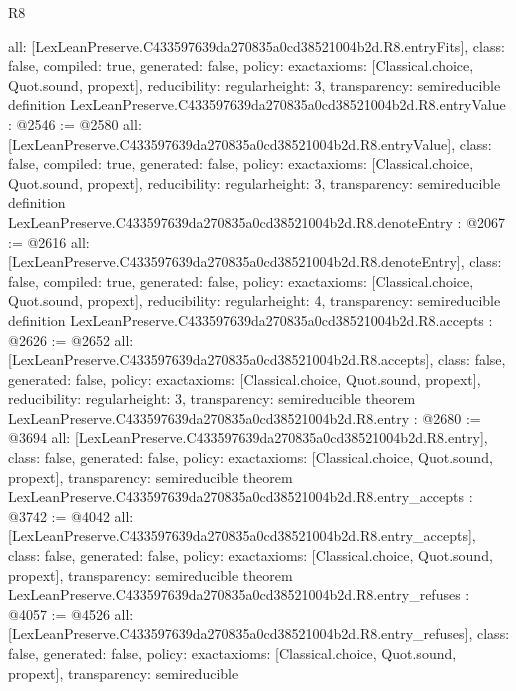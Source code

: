 \begin{lexlean}{R8}
\begin{coremodule}
{  all: [LexLeanPreserve.C433597639da270835a0cd38521004b2d.R8.entryFits],
  class: false,
  compiled: true,
  generated: false,
  policy: exact{axioms: [Classical.choice, Quot.sound, propext]},
  reducibility: regular{height: 3},
  transparency: semireducible
}
definition LexLeanPreserve.C433597639da270835a0cd38521004b2d.R8.entryValue : @2546 := @2580 {
  all: [LexLeanPreserve.C433597639da270835a0cd38521004b2d.R8.entryValue],
  class: false,
  compiled: true,
  generated: false,
  policy: exact{axioms: [Classical.choice, Quot.sound, propext]},
  reducibility: regular{height: 3},
  transparency: semireducible
}
definition LexLeanPreserve.C433597639da270835a0cd38521004b2d.R8.denoteEntry : @2067 := @2616 {
  all: [LexLeanPreserve.C433597639da270835a0cd38521004b2d.R8.denoteEntry],
  class: false,
  compiled: true,
  generated: false,
  policy: exact{axioms: [Classical.choice, Quot.sound, propext]},
  reducibility: regular{height: 4},
  transparency: semireducible
}
definition LexLeanPreserve.C433597639da270835a0cd38521004b2d.R8.accepts : @2626 := @2652 {
  all: [LexLeanPreserve.C433597639da270835a0cd38521004b2d.R8.accepts],
  class: false,
  generated: false,
  policy: exact{axioms: [Classical.choice, Quot.sound, propext]},
  reducibility: regular{height: 3},
  transparency: semireducible
}
theorem LexLeanPreserve.C433597639da270835a0cd38521004b2d.R8.entry : @2680 := @3694 {
  all: [LexLeanPreserve.C433597639da270835a0cd38521004b2d.R8.entry],
  class: false,
  generated: false,
  policy: exact{axioms: [Classical.choice, Quot.sound, propext]},
  transparency: semireducible
}
theorem LexLeanPreserve.C433597639da270835a0cd38521004b2d.R8.entry_accepts : @3742 := @4042 {
  all: [LexLeanPreserve.C433597639da270835a0cd38521004b2d.R8.entry_accepts],
  class: false,
  generated: false,
  policy: exact{axioms: [Classical.choice, Quot.sound, propext]},
  transparency: semireducible
}
theorem LexLeanPreserve.C433597639da270835a0cd38521004b2d.R8.entry_refuses : @4057 := @4526 {
  all: [LexLeanPreserve.C433597639da270835a0cd38521004b2d.R8.entry_refuses],
  class: false,
  generated: false,
  policy: exact{axioms: [Classical.choice, Quot.sound, propext]},
  transparency: semireducible
}


\end{coremodule}
\end{lexlean}
